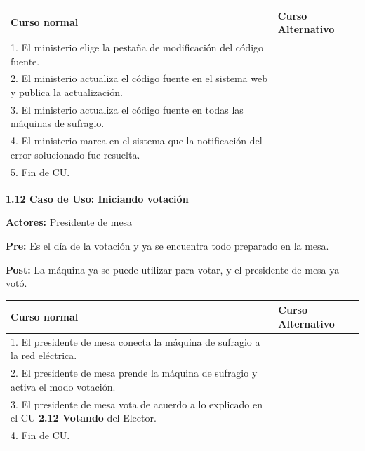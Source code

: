\begin{table}[h!]
	
 \begin{tabular}{|p{7.5cm} | p{7.5cm}|} 
 \hline
 \textbf{Curso normal} & \textbf{Curso Alternativo} \\
 \hline



1. El ministerio elige la pestaña de modificación del código fuente. & \\
\hline

2. El ministerio actualiza el código fuente en el sistema web y publica la actualización. & \\
\hline

3. El ministerio actualiza el código fuente en todas las máquinas de sufragio. & \\
\hline


4. El ministerio marca en el sistema que la notificación del error solucionado fue resuelta. & \\
\hline

5. Fin de CU. & \\
\hline

\end{tabular}
\end{table}

\textbf{1.12 Caso de Uso: Iniciando votación}

\textbf{Actores:} Presidente de mesa

\textbf{Pre:} Es el día de la votación y ya se encuentra todo preparado en la mesa.

\textbf{Post:} La máquina ya se puede utilizar para votar, y el presidente de mesa ya votó.

\begin{table}[h!]
	
 \begin{tabular}{|p{7.5cm} | p{7.5cm}|} 
 \hline
 \textbf{Curso normal} & \textbf{Curso Alternativo} \\
 \hline

1. El presidente de mesa conecta la máquina de sufragio a la red eléctrica. & \\
\hline
2. El presidente de mesa prende la máquina de sufragio y activa el modo votación. & \\
\hline
3. El presidente de mesa vota de acuerdo a lo explicado en el CU \textbf{2.12 Votando} del Elector. & \\
\hline
4. Fin de CU.& \\
\hline



 \end{tabular}

\end{table}

